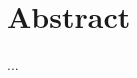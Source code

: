 \documentclass[
    a4paper, %
	fontsize=10pt, %
	twoside=false, %
]{kaobook}
\begin{document}






\chapter*{Abstract}

...


\begingroup %

\setlength{\textheight}{230\vscale} %

\etocstandarddisplaystyle %
\etocstandardlines %

\tableofcontents %

\end{document}
